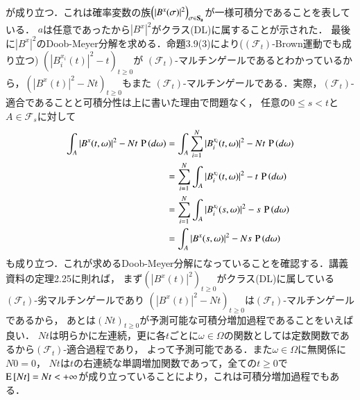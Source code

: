 \begin{prf}
\begin{description}
\begin{align}
		\end{align}
		が成り立つ．これは確率変数の族$\left(|B^x(\sigma)|^2\right)_{\sigma \in \bf{S}_a}$が一様可積分であることを表している．
		$a$は任意であったから$|B^x|^2$がクラス(DL)に属することが示された．
		最後に$|B^x|^2$のDoob-Meyer分解を求める．命題3.9(3)により($(\mathcal{F}_t)$-Brown運動でも成り立つ)
		$\left(|B_i^{x_i}(t)|^2 - t\right)_{t \geq 0}$が
		$(\mathcal{F}_t)$-マルチンゲールであるとわかっているから，$\left(|B^x(t)|^2 - Nt\right)_{t \geq 0}$もまた
		$(\mathcal{F}_t)$-マルチンゲールである．実際，$(\mathcal{F}_t)$-適合であることと可積分性は上に書いた理由で問題なく，
		任意の$0 \leq s < t$と$A \in \mathcal{F}_s$に対して
		\begin{align}
			\int_{A} |B^x(t, \omega)|^2 - Nt\, \operatorname{P} \left(d\omega\right) 
			&= \int_{A} \sum_{i=1}^{N} |B_i^{x_i}(t,\omega)|^2 - Nt\, \operatorname{P} \left(d\omega\right) \\
			&= \sum_{i=1}^{N} \int_{A} |B_i^{x_i}(t,\omega)|^2 - t\, \operatorname{P} \left(d\omega\right) \\
			&= \sum_{i=1}^{N} \int_{A} |B_i^{x_i}(s,\omega)|^2 - s\, \operatorname{P} \left(d\omega\right) \\
			&= \int_{A} |B^x(s, \omega)|^2 - Ns\, \operatorname{P} \left(d\omega\right) 
		\end{align}
		も成り立つ．これが求めるDoob-Meyer分解になっていることを確認する．講義資料の定理2.25に則れば，
		まず$\left(|B^x(t)|^2\right)_{t \geq 0}$がクラス(DL)に属している$(\mathcal{F}_t)$-劣マルチンゲールであり
		$\left(|B^x(t)|^2 - Nt\right)_{t \geq 0}$は$(\mathcal{F}_t)$-マルチンゲールであるから，
		あとは$(Nt)_{t \geq 0}$が予測可能な可積分増加過程であることをいえば良い．
		$Nt$は明らかに左連続，更に各$t$ごとに$\omega \in \Omega$の関数としては定数関数であるから$(\mathcal{F}_t)$-適合過程であり，
		よって予測可能である．また$\omega \in \Omega$に無関係に$N 0 = 0$，
		$Nt$は$t$の右連続な単調増加関数であって，全ての$t \geq 0$で$\operatorname{E} \left[ Nt \right] = Nt < +\infty$が成り立っていることにより，これは可積分増加過程でもある．
	

\end{description}
\end{prf}
